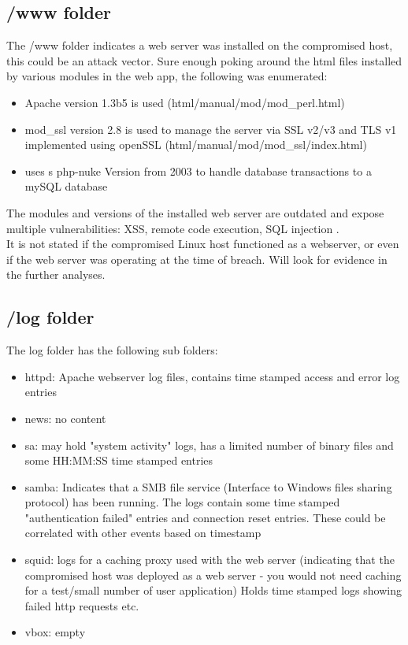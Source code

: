 \documentclass[
	letterpaper, %
	10pt, %
	unnumberedsections, %
	twoside, %
]{APAAssignment}
\begin{document}
\subsection{/www folder}
The /www folder indicates a web server was installed on the compromised host, this could be an attack vector. Sure enough poking around the html files installed by various modules in the web app, the following was enumerated:
\begin{spacing}{1}

	\begin{itemize}
		\item Apache version 1.3b5 is used (html/manual/mod/mod\_perl.html)
		\item mod\_ssl version 2.8 is used to manage the server via SSL v2/v3 and TLS v1 implemented using openSSL (html/manual/mod/mod\_ssl/index.html)
		\item uses s php-nuke Version from 2003 to handle database transactions to a mySQL database
	\end{itemize}

\end{spacing}
The modules and versions of the installed web server are outdated and expose multiple vulnerabilities: XSS, remote code execution, SQL injection \cite{Apache1.3Vulnerabilities}. \\

It is not stated if the compromised Linux host functioned as a webserver, or even if the web server was operating at the time of breach. Will look for evidence in the further analyses.

\subsection{/log folder}
The log folder has the following sub folders:
\begin{spacing}{1}
	\begin{itemize}
		\item httpd: Apache webserver log files, contains time stamped access and error log entries
		\item news: no content
		\item sa: may hold "system activity" logs, has a limited number of binary files and some HH:MM:SS time stamped entries
		\item samba: Indicates that a SMB file service (Interface to Windows files sharing protocol) has been running. The logs contain some time stamped "authentication failed" entries and connection reset entries. These could be correlated with other events based on timestamp
		\item squid: logs for a caching proxy used with the web server (indicating that the compromised host was deployed as a web server - you would not need caching for a test/small number of user application) Holds time stamped logs showing failed http requests etc.
		\item vbox: empty
	\end{itemize}
\end{spacing}
\end{document}
